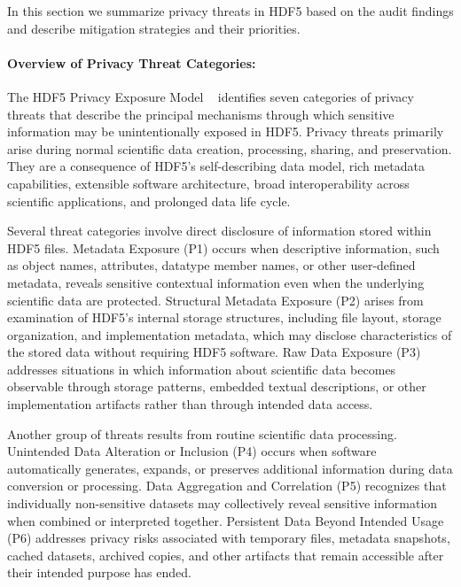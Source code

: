 \documentclass[../main.tex]{subfiles}
\begin{document}
In this section we summarize privacy threats in HDF5 based on the audit findings and 
describe mitigation strategies and their priorities.

\paragraph{Overview of Privacy Threat Categories:}

The HDF5 Privacy Exposure Model ~\cite{PVEM} identifies 
seven categories of privacy threats that describe the principal mechanisms through which 
sensitive information may be unintentionally exposed in HDF5. Privacy threats primarily 
arise during normal scientific data creation, processing, sharing, and preservation. 
They are a consequence of HDF5's self-describing data model, rich metadata capabilities, 
extensible software architecture, broad interoperability across scientific applications, 
and prolonged data life cycle.

Several threat categories involve direct disclosure of information stored within HDF5 files. 
Metadata Exposure (P1) occurs when descriptive information, such as object names, attributes, 
datatype member names, or other user-defined metadata, reveals sensitive contextual 
information even when the underlying scientific data are protected. Structural Metadata 
Exposure (P2) arises from examination of HDF5's internal storage structures, 
including file layout, storage organization, and implementation metadata, which may 
disclose characteristics of the stored data without requiring HDF5 software. 
Raw Data Exposure (P3) addresses situations in which information about scientific data 
becomes observable through storage patterns, embedded textual descriptions, or 
other implementation artifacts rather than through intended data access.

Another group of threats results from routine scientific data processing. Unintended 
Data Alteration or Inclusion (P4) occurs when software automatically generates, expands, 
or preserves additional information during data conversion or processing. 
Data Aggregation and Correlation (P5) recognizes that individually non-sensitive 
datasets may collectively reveal sensitive information when combined or interpreted 
together. Persistent Data Beyond Intended Usage (P6) addresses privacy risks 
associated with temporary files, metadata snapshots, cached datasets, 
archived copies, and other artifacts that remain accessible after their 
intended purpose has ended.
\end{document}

